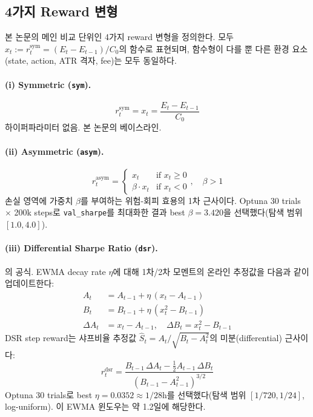 \documentclass[11pt, a4paper]{article}
\begin{document}
\subsection{4가지 Reward 변형}
\label{sec:reward_variants}

본 논문의 메인 비교 단위인 4가지 reward 변형을 정의한다. 모두
$x_t := r_t^{\mathrm{sym}} = (E_t - E_{t-1}) / C_0$의 함수로 표현되며, 함수형이 다를
뿐 다른 환경 요소(state, action, ATR 격자, fee)는 모두 동일하다.

\paragraph{(i) Symmetric (\texttt{sym}).}
\begin{equation}
r_t^{\mathrm{sym}} = x_t = \frac{E_t - E_{t-1}}{C_0}
\end{equation}
하이퍼파라미터 없음. 본 논문의 베이스라인.

\paragraph{(ii) Asymmetric (\texttt{asym}).}
\begin{equation}
r_t^{\mathrm{asym}} =
\begin{cases}
x_t & \text{if } x_t \geq 0 \\
\beta \cdot x_t & \text{if } x_t < 0
\end{cases}, \quad \beta > 1
\end{equation}
손실 영역에 가중치 $\beta$를 부여하는 위험-회피 효용의 1차 근사이다. Optuna 30 trials
$\times$ 200k steps로 \texttt{val\_sharpe}를 최대화한 결과 best $\beta = 3.420$을
선택했다(탐색 범위 $[1.0, 4.0]$).

\paragraph{(iii) Differential Sharpe Ratio (\texttt{dsr}).}
\citet{moody2001dsr}의 공식. EWMA decay rate $\eta$에 대해 1차/2차 모멘트의
온라인 추정값을 다음과 같이 업데이트한다:
\begin{align}
A_t &= A_{t-1} + \eta \, (x_t - A_{t-1}) \\
B_t &= B_{t-1} + \eta \, (x_t^2 - B_{t-1}) \\
\Delta A_t &= x_t - A_{t-1}, \quad \Delta B_t = x_t^2 - B_{t-1}
\end{align}
DSR step reward는 샤프비율 추정값 $\hat{S}_t = A_t / \sqrt{B_t - A_t^2}$의
미분(differential) 근사이다:
\begin{equation}
r_t^{\mathrm{dsr}} =
\frac{B_{t-1} \, \Delta A_t - \tfrac{1}{2} A_{t-1} \, \Delta B_t}
     {(B_{t-1} - A_{t-1}^2)^{3/2}}
\end{equation}
Optuna 30 trials로 best $\eta = 0.0352 \approx 1/28\text{h}$를 선택했다(탐색 범위
$[1/720, 1/24]$, log-uniform). 이 EWMA 윈도우는 약 1.2일에 해당한다.
\end{document}

